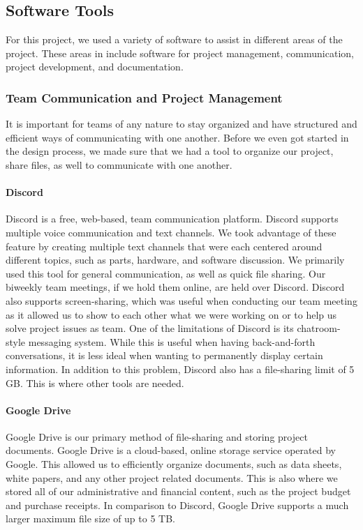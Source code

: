 \subsection{Software Tools}
For this project, we used a variety of software to assist in different areas of the project. These areas in include software for project management, communication, project development, and documentation.

\subsubsection{Team Communication and Project Management}
It is important for teams of any nature to stay organized and have structured and efficient ways of communicating with one another. Before we even got started in the design process, we made sure that we had a tool to organize our project, share files, as well to communicate with one another.

\paragraph{Discord}
Discord is a free, web-based, team communication platform. Discord supports multiple voice communication and text channels. We took advantage of these feature by creating multiple text channels that were each centered around different topics, such as parts, hardware, and software discussion. We primarily used this tool for general communication, as well as quick file sharing. Our biweekly team meetings, if we hold them online, are held over Discord. Discord also supports screen-sharing, which was useful when conducting our team meeting as it allowed us to show to each other what we were working on or to help us solve project issues as team. One of the limitations of Discord is its chatroom-style messaging system. While this is useful when having back-and-forth conversations, it is less ideal when wanting to permanently display certain information. In addition to this problem, Discord also has a file-sharing limit of 5 GB. This is where other tools are needed.

\paragraph{Google Drive}
Google Drive is our primary method of file-sharing and storing project documents. Google Drive is a cloud-based, online storage service operated by Google. This allowed us to efficiently organize documents, such as data sheets, white papers, and any other project related documents. This is also where we stored all of our administrative and financial content, such as the project budget and purchase receipts. In comparison to Discord, Google Drive supports a much larger maximum file size of up to 5 TB.

